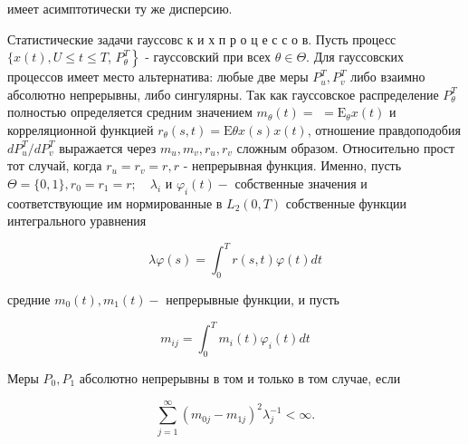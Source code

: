 \documentclass[10pt]{article}
\begin{document}
имеет асимптотически ту же дисперсию.



Статистические задачи гауссовс к и х п р о ц е с с о в. Пусть процесс $\{x(t), U \leqslant t \leqslant T$, $\left.P_{\theta}^{T}\right\}$ - гауссовский при всех $\theta \in \Theta$. Для гауссовских процессов имеет место альтернатива: любые две меры $P_{u}^{T}, P_{v}^{T}$ либо взаимно абсолютно непрерывны, либо сингулярны. Так как гауссовское распределение $P_{\theta}^{T}$ полностью определяется средним значением $m_{\theta}(t)=$ $=\mathrm{E}_{\theta} x(t)$ и корреляционной функцией $r_{\theta}(s, t)=\mathrm{E} \theta x(s) x(t)$, отношение правдоподобия $d P_{u}^{T} / d P_{v}^{T}$ выражается через $m_{u}, m_{v}, r_{u}, r_{v}$ сложным образом. Относительно прост тот случай, когда $r_{u}=r_{v}=r, r$ - непрерывная функция. Именно, пусть $\Theta=\{0,1\}, r_{0}=r_{1}=r ; \quad \lambda_{i}$ и $\varphi_{i}(t)-$ собственные значения и соответствующие им нормированные в $L_{2}(0, T)$ собственные функции интегрального уравнения



\[

\lambda \varphi(s)=\int_{0}^{T} r(s, t) \varphi(t) d t

\]



средние $m_{0}(t), m_{1}(t)-$ непрерывные функции, и пусть



\[

m_{i j}=\int_{0}^{T} m_{i}(t) \varphi_{i}(t) d t

\]



Меры $P_{0}, P_{1}$ абсолютно непрерывны в том и только в том случае, если



\[

\sum_{j=1}^{\infty}\left(m_{0 j}-m_{1 j}\right)^{2} \lambda_{j}^{-1}<\infty .

\]
\end{document}
